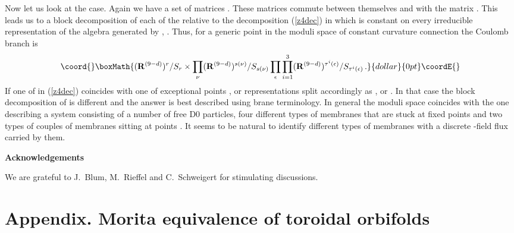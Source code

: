 \documentclass[a4paper,a4paper]{article}
\begin{document}
{Now let us look at the \coordHE{} case. Again we have a set of \coordHE{}  \coordHE{} matrices \coordHE{}. These matrices 
commute between themselves and with  the  matrix \coordHE{}. 
This leads us to a block decomposition of each of the \coordHE{} relative to the decomposition (\ref{z4dec}) in which \coordHE{} is 
constant on every irreducible representation of the algebra generated by \coordHE{}, \coordHE{}. 
Thus, for a generic point in the moduli space of constant curvature connection the Coulomb branch is 
$$\coord{}\boxMath{
({\bf R}^{(9-d)})^{r}/S_{r}\times \prod_{\nu}({\bf R}^{(9-d)})^{s(\nu)}/S_{s(\nu)}
\prod_{\epsilon}\prod_{i=1}^{3}({\bf R}^{(9-d)})^{\tau^{i}(\epsilon)}/S_{\tau^{i}(\epsilon)} \, . 
}{dollar}{0pt}\coordE{}$$  
If one of \coordHE{} in (\ref{z4dec}) coincides with one of exceptional points \coordHE{}, \coordHE{} or 
\myHighlight{$\Lambda_{\epsilon}$}\coordHE{} representations \coordHE{} split accordingly as 
\coordHE{}, or  
\coordHE{}. In that case the block decomposition of \coordHE{} 
is  different and the answer is best described using  brane terminology. 
In general the moduli space coincides with the one describing  a system consisting of a number of free D0 particles, 
four different types of membranes that are stuck at fixed points and two types of couples of membranes sitting at points 
\coordHE{}. It seems to be natural to identify different types of membranes  with a 
discrete \coordHE{}-field flux carried by them.  \\
\begin{center} {\bf Acknowledgements} 
\end{center}
We are grateful to J.~Blum, M.~Rieffel  and C.~Schweigert for stimulating discussions. 
\appendix
\section*{Appendix. Morita equivalence of toroidal orbifolds}

}
\end{document}
